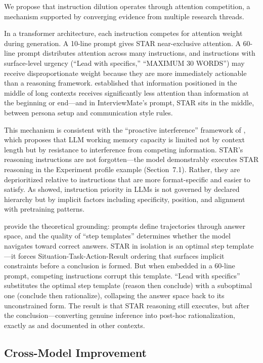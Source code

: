 \documentclass[11pt]{article}
\begin{document}
We propose that instruction dilution operates through attention competition, a mechanism supported by converging evidence from multiple research threads.

In a transformer architecture, each instruction competes for attention weight during generation. A 10-line prompt gives STAR near-exclusive attention. A 60-line prompt distributes attention across many instructions, and instructions with surface-level urgency (``Lead with specifics,'' ``MAXIMUM 30 WORDS'') may receive disproportionate weight because they are more immediately actionable than a reasoning framework. \citet{liu2024} established that information positioned in the middle of long contexts receives significantly less attention than information at the beginning or end---and in InterviewMate's prompt, STAR sits in the middle, between persona setup and communication style rules.

This mechanism is consistent with the ``proactive interference'' framework of \citet{wang2025}, which proposes that LLM working memory capacity is limited not by context length but by resistance to interference from competing information. STAR's reasoning instructions are not forgotten---the model demonstrably executes STAR reasoning in the Experiment profile example (Section~7.1). Rather, they are deprioritized relative to instructions that are more format-specific and easier to satisfy. As \citet{geng2025} showed, instruction priority in LLMs is not governed by declared hierarchy but by implicit factors including specificity, position, and alignment with pretraining patterns.

\citet{zhang2025} provide the theoretical grounding: prompts define trajectories through answer space, and the quality of ``step templates'' determines whether the model navigates toward correct answers. STAR in isolation is an optimal step template---it forces Situation-Task-Action-Result ordering that surfaces implicit constraints before a conclusion is formed. But when embedded in a 60-line prompt, competing instructions corrupt this template. ``Lead with specifics'' substitutes the optimal step template (reason then conclude) with a suboptimal one (conclude then rationalize), collapsing the answer space back to its unconstrained form. The result is that STAR reasoning still executes, but after the conclusion---converting genuine inference into post-hoc rationalization, exactly as \citet{turpin2023} and \citet{lanham2023} documented in other contexts.

\subsection{Cross-Model Improvement}
\end{document}
